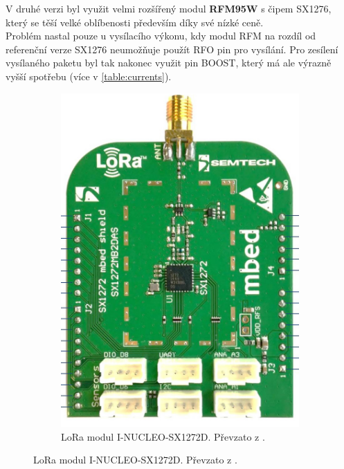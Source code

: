     V druhé verzi byl využit velmi rozšířený modul  \textbf{RFM95W} s čipem SX1276, který se těší velké oblíbenosti především díky své nízké ceně.\\
    Problém nastal pouze u vysílacího výkonu, kdy modul RFM na rozdíl od referenční verze SX1276 neumožňuje použít RFO pin pro vysílání. Pro zesílení vysílaného paketu byl tak nakonec využit pin BOOST, který má ale výrazně vyšší spotřebu (více v \ref{table:currents}).
    
    
     \begin{figure} [!h]
        \centering
        \begin{subfigure}[b]{0.4\textwidth}
             \centering
             \includegraphics[width=\textwidth]{HW_PART/Figs/SX1272_pinout2.jpg}
             \caption {LoRa modul I-NUCLEO-SX1272D. Převzato z \cite{software:2}.}
         \end{subfigure}
         \hfill

\end{figure}
